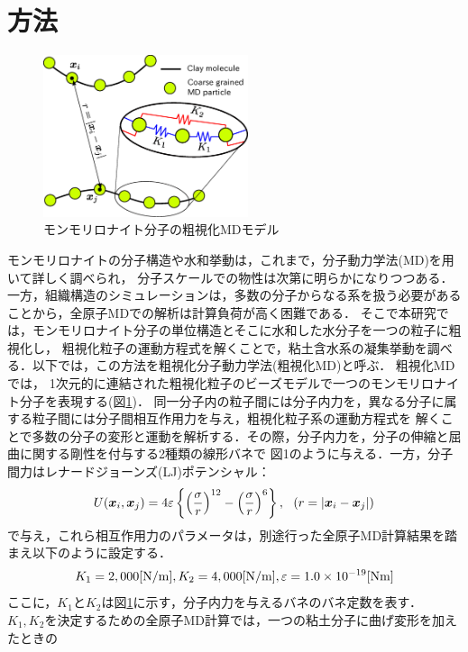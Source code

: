 ﻿\documentclass[11pt,a4j]{jarticle}
\begin{document}
\section{方法}
\begin{figure}
	\centering
	\includegraphics[keepaspectratio,width=60mm]{Figs/cg_model.eps}
	\caption{モンモリロナイト分子の粗視化MDモデル}
	\label{fig:fig1}
\end{figure}
モンモリロナイトの分子構造や水和挙動は，これまで，分子動力学法(MD)を用いて詳しく調べられ，
分子スケールでの物性は次第に明らかになりつつある\cite{Kawamura}．
一方，組織構造のシミュレーションは，多数の分子からなる系を扱う必要があることから，全原子MDでの解析は計算負荷が高く困難である．
そこで本研究では，モンモリロナイト分子の単位構造とそこに水和した水分子を一つの粒子に粗視化し，
粗視化粒子の運動方程式を解くことで，粘土含水系の凝集挙動を調べる．以下では，この方法を粗視化分子動力学法(粗視化MD)と呼ぶ．
粗視化MDでは， 1次元的に連結された粗視化粒子のビーズモデルで一つのモンモリロナイト分子を表現する(図\ref{fig:fig1})．
同一分子内の粒子間には分子内力を，異なる分子に属する粒子間には分子間相互作用力を与え，粗視化粒子系の運動方程式を
解くことで多数の分子の変形と運動を解析する．その際，分子内力を，分子の伸縮と屈曲に関する剛性を付与する2種類の線形バネで
図1のように与える．一方，分子間力はレナードジョーンズ(LJ)ポテンシャル：
\begin{equation}
	U(\mbox{\boldmath $x$}_i,\mbox{\boldmath $x$}_j)=4\varepsilon
	\left\{ \left(\frac{\sigma}{r}\right)^{12}-
	\left( \frac{\sigma}{r}\right)^6\right\}, 
	\ \ \left(r=\left| \mbox{\boldmath $x$}_i-\mbox{\boldmath $x$}_j\right|\right)
	\label{eqn:LJ}
\end{equation}
で与え，これら相互作用力のパラメータは，別途行った全原子MD計算結果を踏まえ以下のように設定する．
\begin{equation}
	K_1  = 2,000[{\rm N / m}],   K_2  = 4,000[{\rm N / m}],  \varepsilon = 1.0\times10^{-19}     [{\rm Nm}]
	\label{eqn:prms}
\end{equation}
ここに，$K_1$と$K_2$は図\ref{fig:fig1}に示す，分子内力を与えるバネのバネ定数を表す．
$K_1,K_2$を決定するための全原子MD計算では，一つの粘土分子に曲げ変形を加えたときの
\end{document}
